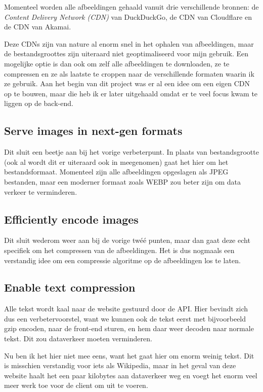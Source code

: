 \documentclass[a4paper]{report}
\begin{document}
    Momenteel worden alle afbeeldingen gehaald vanuit drie verschillende bronnen: de \textit{Content Delivery Network (CDN)} van DuckDuckGo,
    de CDN van Cloudflare en de CDN van Akamai.

    Deze CDNs zijn van nature al enorm snel in het ophalen van afbeeldingen, maar de bestandsgroottes zijn uiteraard niet geoptimaliseerd voor mijn gebruik.
    Een mogelijke optie is dan ook om zelf alle afbeeldingen te downloaden, ze te compressen en ze als laatste te croppen naar de verschillende formaten waarin ik ze gebruik.
    Aan het begin van dit project was er al een idee om een eigen CDN op te bouwen, maar die heb ik er later uitgehaald omdat er te veel focus kwam te liggen op de back-end.

    \subsection{Serve images in next-gen formats}
    Dit sluit een beetje aan bij het vorige verbeterpunt. In plaats van bestandsgrootte (ook al wordt dit er uiteraard ook in meegenomen) gaat het hier om het bestandsformaat.
    Momenteel zijn alle afbeeldingen opgeslagen als JPEG bestanden, maar een moderner formaat zoals WEBP zou beter zijn om data verkeer te verminderen.

    \subsection{Efficiently encode images}
    Dit sluit wederom weer aan bij de vorige twéé punten, maar dan gaat deze echt specifiek om het compressen van de afbeeldingen.
    Het is dus nogmaals een verstandig idee om een compressie algoritme op de afbeeldingen los te laten.

    \subsection{Enable text compression}
    Alle tekst wordt kaal naar de website gestuurd door de API. Hier bevindt zich dus een verbetervoorstel, want we kunnen ook de tekst eerst met bijvoorbeeld
    {\selectfont gzip} encoden, naar de front-end sturen, en hem daar weer decoden naar normale tekst. Dit zou dataverkeer moeten verminderen.

    Nu ben ik het hier niet mee eens, want het gaat hier om enorm weinig tekst. Dit is misschien verstandig voor iets als Wikipedia, maar in het geval van deze website
    haalt het een paar kilobytes aan dataverkeer weg en voegt het enorm veel meer werk toe voor de client om uit te voeren.
\end{document}
